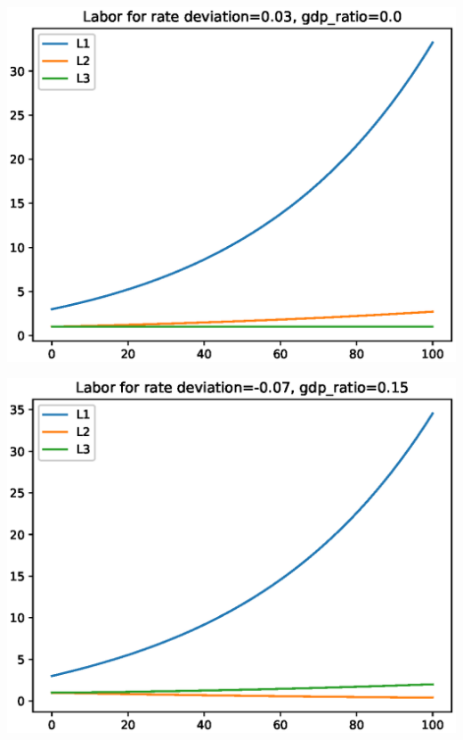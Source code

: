 \documentclass[12pt]{article}
\theoremstyle{definition}
\begin{document}
\begin{minipage}{\linewidth}
\begin{framed}
\begin{minipage}[t]{.48\textwidth}
\includegraphics[width=1\textwidth]{images/econ_0_run_2_labor}
\end{minipage}\hfill
\begin{minipage}[t]{.48\textwidth}
\centering
\includegraphics[width=1\textwidth]{images/econ_0_run_3_labor}
\end{minipage} \hfill
\begin{minipage}[t]{.48\textwidth}
\centering

\end{minipage}
\end{framed}
\end{minipage}
\end{document}
